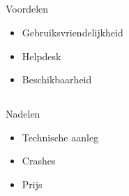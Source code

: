 \documentclass{beamer}
\begin{document}
    \subsection{}
    \begin{frame}{Voordelen}
        \begin{itemize}
            \item Gebruiksvriendelijkheid
            \item Helpdesk
            \item Beschikbaarheid
        \end{itemize}
    \end{frame}
            
    \subsection{}
    \begin{frame}{Nadelen}
        \begin{itemize}
            \item Technische aanleg
            \item Crashes
            \item Prijs
        \end{itemize}
    \end{frame}
    
    
    
\end{document}

